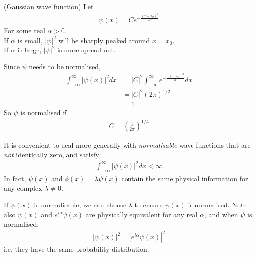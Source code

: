 \documentclass[a4paper]{article}
\begin{document}
\begin{eg} (Gaussian wave function) Let 
\begin{equation*}
\begin{aligned}
\psi\left(x\right) = C e^{-\frac{\left(x-x_0\right)^2}{2\alpha}}
\end{aligned}
\end{equation*}
For some real $\alpha > 0$.\\
If $\alpha$ is small, $|\psi|^2$ will be sharply peaked around $x=x_0$.\\
If $\alpha$ is large, $|\psi|^2$ is more spread out.

Since $\psi$ needs to be normalised,
\begin{equation*}
\begin{aligned}
\int_{-\infty}^\infty |\psi\left(x\right)|^2 dx &= |C|^2 \int_{-\infty}^\infty e^{-\frac{\left(x-x_0\right)^2}{\alpha}}dx\\
&= |C|^2 \left(2\pi\right)^{1/2}\\
&= 1
\end{aligned}
\end{equation*}
So $\psi$ is normalised if 
\begin{equation*}
\begin{aligned}
C=\left(\frac{1}{2\pi}\right)^{1/4}
\end{aligned}
\end{equation*}
\end{eg}

It is convenient to deal more generally with \emph{normalisable} wave functions that are \emph{not} identically zero, and satisfy
\begin{equation*}
\begin{aligned}
\int_{-\infty}^\infty |\psi\left(x\right)|^2 dx < \infty
\end{aligned}
\end{equation*}
In fact, $\psi\left(x\right)$ and $\phi\left(x\right) = \lambda \psi\left(x\right)$ contain the same physical information for any complex $\lambda \neq 0$.

If $\psi\left(x\right)$ is normalisable, we can choose $\lambda$ to ensure $\psi\left(x\right)$ is normalised. Note also $\psi\left(x\right)$ and $e^{i\alpha} \psi\left(x\right)$ are physically equivalent for any real $\alpha$, and when $\psi$ is normalised,
\begin{equation*}
\begin{aligned}
|\psi\left(x\right)|^2 = |e^{i\alpha} \psi\left(x\right)|^2
\end{aligned}
\end{equation*}
i.e. they have the same probability distribution.
\end{document}
